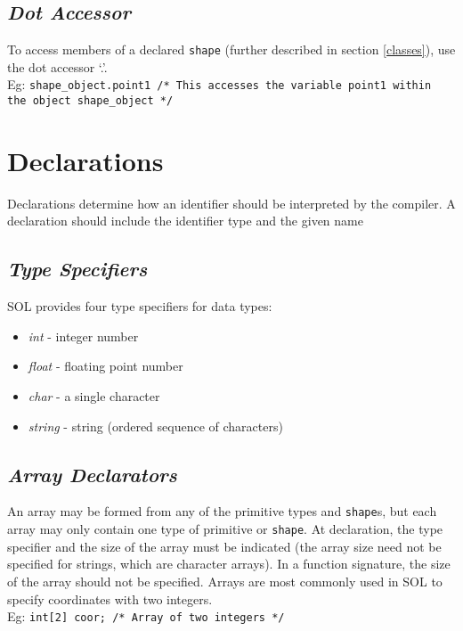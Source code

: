 \documentclass[letterpaper,12pt]{article}
\begin{document}
	\subsection{\textit{Dot Accessor}}
	To access members of a declared \texttt{shape} (further described in section \ref{classes}), use the dot accessor `.'. \\
	Eg: \texttt{shape\_object.point1 /* This accesses the variable point1 within the object shape\_object */}


\section{Declarations}

    Declarations determine how an identifier should be interpreted by the compiler. A declaration should include the identifier type and the given name

    \subsection{\textit{Type Specifiers}} \label{type}
    SOL provides four type specifiers for data types:
    \begin{itemize}
        \itemsep0em
        \item \textit{int} - integer number
        \item \textit{float} - floating point number
        \item \textit{char} - a single character
        \item \textit{string} - string (ordered sequence of characters)
    \end{itemize}

	\subsection{\textit{Array Declarators}} \label{array}
    An array may be formed from any of the primitive types and \texttt{shape}s, but each array may only contain one type of primitive or \texttt{shape}. At declaration, the type specifier and the size of the array must be indicated (the array size need not be specified for strings, which are character arrays). In a function signature, the size of the array should not be specified. Arrays are most commonly used in SOL to specify coordinates with two integers.\\
    Eg: \texttt{int[2] coor; /* Array of two integers */}
\end{document}
